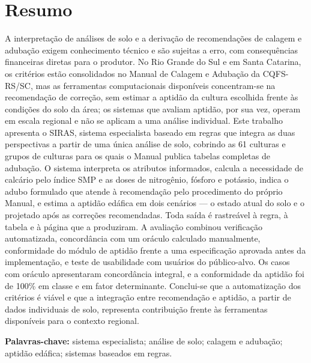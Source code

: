 
\chapter*{Resumo}

A interpretação de análises de solo e a derivação de recomendações de calagem e adubação
exigem conhecimento técnico e são sujeitas a erro, com consequências financeiras diretas
para o produtor. No Rio Grande do Sul e em Santa Catarina, os critérios estão
consolidados no Manual de Calagem e Adubação da CQFS-RS/SC, mas as ferramentas
computacionais disponíveis concentram-se na recomendação de correção, sem estimar a
aptidão da cultura escolhida frente às condições do solo da área; os sistemas que avaliam
aptidão, por sua vez, operam em escala regional e não se aplicam a uma análise
individual. Este trabalho apresenta o SIRAS, sistema especialista baseado em regras que
integra as duas perspectivas a partir de uma única análise de solo, cobrindo as 61
culturas e grupos de culturas para os quais o Manual publica tabelas completas de
adubação. O sistema interpreta os atributos informados, calcula a necessidade de calcário
pelo índice SMP e as doses de nitrogênio, fósforo e potássio, indica o adubo formulado
que atende à recomendação pelo procedimento do próprio Manual, e estima a aptidão edáfica
em dois cenários --- o estado atual do solo e o projetado após as correções recomendadas.
Toda saída é rastreável à regra, à tabela e à página que a produziram. A avaliação
combinou verificação automatizada, concordância com um oráculo calculado manualmente,
conformidade do módulo de aptidão frente a uma especificação aprovada antes da
implementação, e teste de usabilidade com usuários do público-alvo. Os casos com oráculo
apresentaram concordância integral, e a conformidade da aptidão foi de 100\% em classe e
em fator determinante. 
Conclui-se que a automatização dos critérios é viável e que a integração entre
recomendação e aptidão, a partir de dados individuais de solo, representa contribuição
frente às ferramentas disponíveis para o contexto regional.

\textbf{Palavras-chave:} sistema especialista; análise de solo; calagem e adubação;
aptidão edáfica; sistemas baseados em regras.

